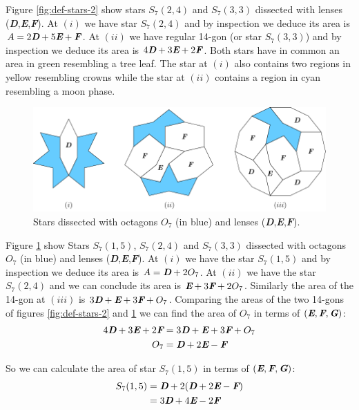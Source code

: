 \documentclass[11pt]{article}
\def\mathbi#1{\textbf{\em #1}}
\begin{document}
Figure \ref{fig:def-stars-2} show stars $S_7(2,4)$ and $S_7(3,3)$ dissected with lenses (\mathbi{D},\mathbi{E},\mathbi{F}).
At $(i)$ we have star $S_7(2,4)$ and by inspection we deduce its area is $A = 2\mathbi{D} + 5\mathbi{E} + \mathbi{F}$. At $(ii)$ we have regular 14-gon (or star $S_7(3,3)$) and by inspection we deduce its area is $4\mathbi{D} + 3\mathbi{E} + 2\mathbi{F}$. Both stars have in common an area in green resembling a tree leaf. The star at $(i)$ also contains two regions in yellow resembling crowns while the star at $(ii)$ contains a region in cyan resembling a moon phase.

\begin{figure}[H]
\centering
\includegraphics[scale=1.1]{def/def-stars-3}
\caption{Stars dissected with octagons \mathbi{$O_7$} (in blue) and lenses (\mathbi{D},\mathbi{E},\mathbi{F}).}
\label{fig:def-stars-3}
\end{figure}
 
Figure \ref{fig:def-stars-3} show Stars $S_7(1,5)$, $S_7(2,4)$ and $S_7(3,3)$ dissected with octagons \mathbi{$O_7$} (in blue) and lenses (\mathbi{D},\mathbi{E},\mathbi{F}). At $(i)$ we have the star $S_7(1,5)$ and by inspection we deduce its area is $A = \mathbi{D} + 2\mathbi{$O_7$}$. At $(ii)$ we have the star $S_7(2,4)$ and we can conclude its area is $\mathbi{E} + 3\mathbi{F} + 2\mathbi{$O_7$}$. Similarly the area of the 14-gon at $(iii)$ is $3\mathbi{D} + \mathbi{E} + 3\mathbi{F} + \mathbi{$O_7$}$. Comparing the areas of the two 14-gons of figures \ref{fig:def-stars-2} and \ref{fig:def-stars-3} we can find the area of \mathbi{$O_7$} in terms of $(\mathbi{E},\mathbi{F},\mathbi{G})$:
\begin{align}
4\mathbi{D} + 3\mathbi{E} + 2\mathbi{F} &= 
 3\mathbi{D} + \mathbi{E} + 3\mathbi{F} + \mathbi{$O_7$}\nonumber\\
\mathbi{$O_7$} &= \mathbi{D} + 2\mathbi{E} - \mathbi{F}
\end{align}

So we can calculate the area of star $S_7(1,5)$ in terms of $(\mathbi{E},\mathbi{F},\mathbi{G})$:
\begin{align}
S_7(1,5) &= \mathbi{D} + 2(\mathbi{D} + 2\mathbi{E} - \mathbi{F}) \nonumber\\
 &= 3\mathbi{D} + 4\mathbi{E} - 2\mathbi{F}
\end{align}
\end{document}
